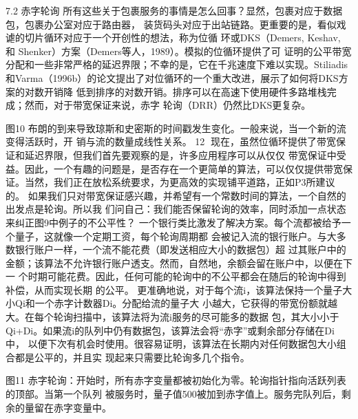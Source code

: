 7.2 赤字轮询
所有这些关于包裹服务的事情是怎么回事？显然，包裹对应于数据包，包裹办公室对应于路由器，
装货码头对应于出站链路。更重要的是，看似戏谑的切片循环对应于一个开创性的想法，称为位循
环或DKS（Demers, Keshav, 和 Shenker）方案（Demers等人，1989）。模拟的位循环提供了可
证明的公平带宽分配和一些非常严格的延迟界限；不幸的是，它在千兆速度下难以实现。Stiliadis
和Varma（1996b）的论文提出了对位循环的一个重大改进，展示了如何将DKS方案的对数开销降
低到排序的对数开销。排序可以在高速下使用硬件多路堆栈完成；然而，对于带宽保证来说，赤字
轮询（DRR）仍然比DKS更复杂。




图10 布朗的到来导致琼斯和史密斯的时间戳发生变化。一般来说，当一个新的流变得活跃时，开
销与流的数量成线性关系。
                                                          12
现在，虽然位循环提供了带宽保证和延迟界限，但我们首先要观察的是，许多应用程序可以从仅仅
带宽保证中受益。因此，一个有趣的问题是，是否存在一个更简单的算法，可以仅仅提供带宽保
证。当然，我们正在放松系统要求，为更高效的实现铺平道路，正如P3所建议的。
如果我们只对带宽保证感兴趣，并希望有一个常数时间的算法，一个自然的出发点是轮询。所以我
们问自己：我们能否保留轮询的效率，同时添加一点状态来纠正图9中例子的不公平性？
一个银行类比激发了解决方案。每个流都被给予一个量子，这就像一个定期工资，每个轮询周期都
会被记入流的银行账户。与大多数银行账户一样，一个流不能花费（即发送相应大小的数据包）超
过其账户中的金额；该算法不允许银行账户透支。然而，自然地，余额会留在账户中，以便在下一
个时期可能花费。因此，任何可能的轮询中的不公平都会在随后的轮询中得到补偿，从而实现长期
的公平。
更准确地说，对于每个流i，该算法保持一个量子大小Qi和一个赤字计数器Di。分配给流的量子大
小越大，它获得的带宽份额就越大。在每个轮询扫描中，该算法将为流i服务的尽可能多的数据
包，其大小小于Qi+Di。如果流i的队列中仍有数据包，该算法会将“赤字”或剩余部分存储在Di中，
以便下次有机会时使用。很容易证明，该算法在长期内对任何数据包大小组合都是公平的，并且实
现起来只需要比轮询多几个指令。




图11 赤字轮询：开始时，所有赤字变量都被初始化为零。轮询指针指向活跃列表的顶部。当第一个队列
被服务时，量子值500被加到赤字值上。服务完队列后，剩余的量留在赤字变量中。


